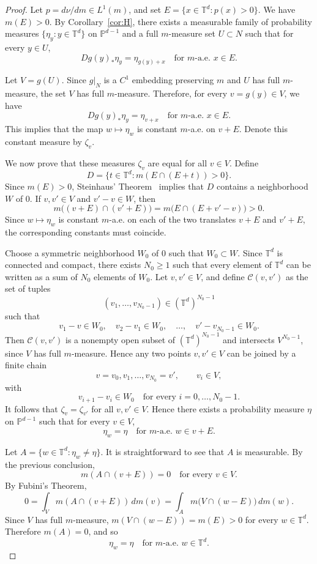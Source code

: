 \documentclass[a4paper,12pt,reqno]{amsart}
\numberwithin{equation}{section}
\newcommand{\Tt}{{\mathbb{T}}}
\begin{document}
\begin{proof}
Let $p=d\nu/dm \in L^1(m)$, and set $E=\{x\in\Tt^d:p(x)>0\}$. We have $m(E)>0$. By Corollary~\ref{cor:H}, there exists a measurable
family of probability measures $\{\eta_y:y\in\Tt^d\}$ on $\mathbb P^{d-1}$ and a full $m$-measure set $U\subset N$ such that for every $y\in U$,
\[
Dg(y)_*\eta_y=\eta_{g(y)+x}
\quad\text{for }m\text{-a.e. }x\in E.
\]

Let $V=g(U)$. Since $g|_N$ is a $C^1$ embedding preserving $m$ and $U$ has full $m$-measure, the set $V$ has full $m$-measure. Therefore, for every
$v = g(y) \in V$, we have
\[
Dg(y)_*\eta_y = \eta_{v+x} \quad\text{for }m\text{-a.e. }x\in E.
\]
This implies that the map $w\mapsto\eta_w$ is constant $m$-a.e. on $v+E$. Denote this constant measure by $\zeta_v$.

We now prove that these measures $\zeta_v$ are equal for all $v \in V$. Define
\[
D=\{t\in\Tt^d:m(E\cap(E+t))>0\}.
\]
Since $m(E)>0$, Steinhaus' Theorem~\cite[Corollary 20.17]{hewittross} implies that $D$ contains a neighborhood
$W$ of $0$. If $v,v'\in V$ and $v'-v\in W$, then
\[
m\bigl((v+E)\cap(v'+E)\bigr)
=
m\bigl(E\cap(E+v'-v)\bigr)>0.
\]
Since $w\mapsto\eta_w$ is constant $m$-a.e. on each of the two translates
$v+E$ and $v'+E$, the corresponding constants must coincide.

Choose a symmetric neighborhood $W_0$ of $0$ such that $W_0\subset W$. Since $\Tt^d$ is connected and compact, there exists $N_0\ge 1$ such that
every element of $\Tt^d$ can be written as a sum of $N_0$ elements of $W_0$.
Let $v,v'\in V$, and define $\mathcal C(v,v')$ as the set of tuples
\[
(v_1,\ldots,v_{N_0-1})\in(\Tt^d)^{N_0-1}
\]
such that
\[
v_1-v\in W_0,\quad v_2-v_1\in W_0,\quad \ldots,\quad v'-v_{N_0-1}\in W_0.
\]
Then $\mathcal C(v,v')$ is a nonempty open subset of $(\Tt^d)^{N_0-1}$ and intersects $V^{N_0-1}$, since $V$ has full $m$-measure. Hence any two points $v,v'\in V$ can
be joined by a finite chain
\[
v=v_0,v_1,\ldots,v_{N_0}=v',
\qquad v_i\in V,
\]
with
\[
v_{i+1}-v_i\in W_0
\quad\text{for every }i=0,\ldots,N_0-1.
\]
It follows that $\zeta_v = \zeta_{v'}$ for all $v,v' \in V$. Hence there exists a probability measure $\eta$ on $\mathbb P^{d-1}$ such that for every $v\in V$,
\[
\eta_w=\eta \quad\text{for }m\text{-a.e. }w\in v+E.
\]

Let $A=\{w\in\Tt^d:\eta_w\neq\eta\}$. It is straightforward to see that $A$ is measurable. By the previous conclusion, 
\[
m(A\cap(v+E))=0 \quad \text{for every } v\in V.
\]
By Fubini's Theorem,
\[
0 = \int_V m(A\cap(v+E))\,dm(v) = \int_A m\bigl(V\cap(w-E)\bigr)\,dm(w).
\]
Since $V$ has full $m$-measure, $m(V\cap(w-E))=m(E)>0$ for every $w\in\Tt^d$. Therefore $m(A)=0$, and so
\[
\eta_w=\eta
\quad\text{for }m\text{-a.e. }w\in\Tt^d.
\]


\end{proof}
\end{document}
